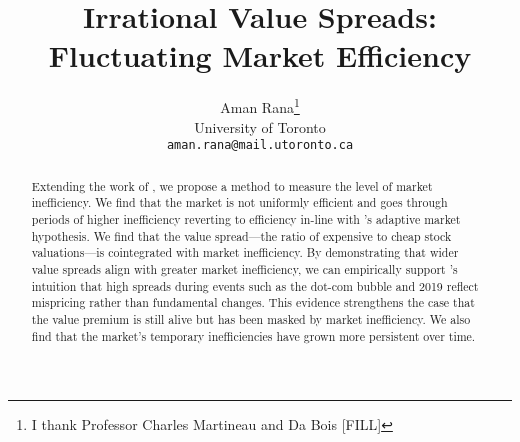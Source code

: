\documentclass[11pt,a4paper,english]{article}
\date{\displaydate{date}}
\title{Irrational Value Spreads: Fluctuating Market Efficiency}
\author{%
  Aman Rana\thanks{I thank Professor Charles Martineau and Da Bois [FILL]}\\
  \small University of Toronto\\
  \small\texttt{aman.rana@mail.utoronto.ca}
}
\begin{document}
  \maketitle

  \begin{abstract}
    \noindent Extending the work of \citep{boguth_2023}, we propose a method to measure the level of market inefficiency.
    We find that the market is not uniformly efficient and goes through periods of higher inefficiency reverting to efficiency in-line with \cite{lo_amh}'s adaptive 
    market hypothesis. We find that the value spread—the ratio of expensive to cheap stock valuations—is cointegrated with market inefficiency. 
    By demonstrating that wider value spreads align with greater market inefficiency, we can empirically support \citet{asness_2024}'s intuition 
    that high spreads during events such as the dot-com bubble and 2019 reflect mispricing rather than fundamental changes. 
    This evidence strengthens the case that the value premium is still alive but has been masked by market inefficiency. 
    We also find that the market's temporary inefficiencies have grown more persistent over time.
  \end{abstract}

  \newpage

  \newpage
  

  \newpage
  

  
  
  \newpage
  

  \newpage
  

  \newpage
  
  

  \newpage
  
\end{document}

